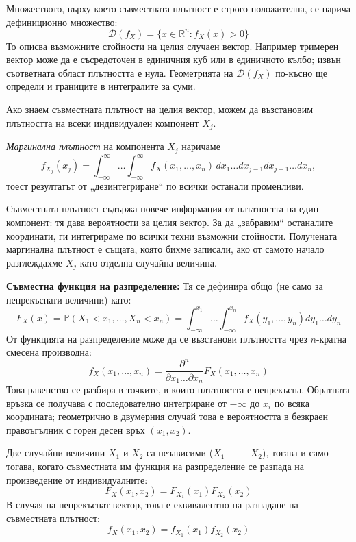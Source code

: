 Множеството, върху което съвместната плътност е строго положителна, се нарича дефиниционно множество:
\[
\mathcal{D}(f_X) = \{ x \in \mathbb{R}^n : f_X(x) > 0 \}
\]
То описва възможните стойности на целия случаен вектор. Например тримерен вектор може да е съсредоточен в единичния куб или в единичното кълбо; извън съответната област плътността е нула. Геометрията на $\mathcal{D}(f_X)$ по-късно ще определи и границите в интегралите за суми.

Ако знаем съвместната плътност на целия вектор, можем да възстановим плътността на всеки индивидуален компонент $X_j$.

\begin{defn}\label{def:marginal}
\emph{Маргинална плътност} на компонента $X_j$ наричаме
\[
f_{X_j}(x_j) = \int_{-\infty}^{\infty} \dots \int_{-\infty}^{\infty} f_X(x_1, \dots, x_n) \, dx_1 \dots dx_{j-1} dx_{j+1} \dots dx_n ,
\]
тоест резултатът от „дезинтегриране“ по всички останали променливи.
\end{defn}

Съвместната плътност съдържа повече информация от плътността на един компонент: тя дава вероятности за целия вектор. За да „забравим“ останалите координати, ги интегрираме по всички техни възможни стойности. Получената маргинална плътност е същата, която бихме записали, ако от самото начало разглеждахме $X_j$ като отделна случайна величина.

\textbf{Съвместна функция на разпределение:}
Тя се дефинира общо (не само за непрекъснати величини) като:
\[
F_X(x) = \mathbb{P}(X_1 < x_1, \dots, X_n < x_n) = \int_{-\infty}^{x_1} \dots \int_{-\infty}^{x_n} f_X(y_1, \dots, y_n) dy_1 \dots dy_n
\]
От функцията на разпределение може да се възстанови плътността чрез $n$-кратна смесена производна:
\[
f_X(x_1, \dots, x_n) = \frac{\partial^n}{\partial x_1 \dots \partial x_n} F_X(x_1, \dots, x_n)
\]
Това равенство се разбира в точките, в които плътността е непрекъсна. Обратната връзка се получава с последователно интегриране от $-\infty$ до $x_i$ по всяка координата; геометрично в двумерния случай това е вероятността в безкраен правоъгълник с горен десен връх $(x_1,x_2)$.

\begin{thm}\label{thm:indep-density}
Две случайни величини $X_1$ и $X_2$ са независими ($X_1 \perp\!\!\!\perp X_2$), тогава и само тогава, когато съвместната им функция на разпределение се разпада на произведение от индивидуалните:
\[
F_X(x_1, x_2) = F_{X_1}(x_1) F_{X_2}(x_2)
\]
В случая на непрекъснат вектор, това е еквивалентно на разпадане на съвместната плътност:
\[
f_X(x_1, x_2) = f_{X_1}(x_1) f_{X_2}(x_2)
\]
\end{thm}

